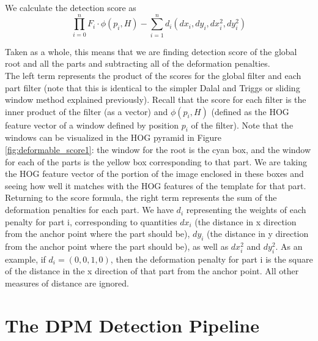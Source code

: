\documentclass{article}
\begin{document}
We calculate the detection score as 
$$\prod_{i=0}^{n}F_i \cdot \phi(p_i,H) - \sum_{i=1}^{n}d_i(dx_i,dy_i,dx_i^2, dy_i^2)$$

Taken as a whole, this means that we are finding detection score of the global root and 
all the parts and subtracting all of the deformation penalties.\\

The left term represents the product of the
scores for the global filter and each
part filter (note that this is identical to the simpler Dalal and Triggs \cite{hog_human_detection} or sliding
window method explained previously).
Recall that the score for each filter is
the inner product of the filter (as a vector) and $\phi(p_i,H)$ (defined as
the HOG feature vector of a window defined by position $p_i$ of the filter). Note
that the windows can be visualized in the HOG pyramid in Figure 
\ref{fig:deformable_score1}: the window for the root is the cyan box, and the window
for each of the parts is the yellow box corresponding to that part. We are taking
the HOG feature vector of the portion of the image enclosed in these boxes and seeing how well it matches with the HOG features of the template for that part.\\

Returning to the score formula, the right term represents the sum of the 
deformation penalties for each part.
We have $d_i$ representing the weights of each penalty for part i, corresponding to quantities
$dx_i$ (the distance in x direction from the anchor point where the part should be), 
$dy_i$ (the distance in y direction from the anchor point where the part should be), as 
well as $dx_i^2$ and $dy_i^2$. As an example, if $d_i = (0, 0, 1, 0)$, then the 
deformation penalty for part i is the square of the distance in the x direction of
that part from the anchor point. All other measures of distance are ignored.\\

\section{The DPM Detection Pipeline}
\end{document}
